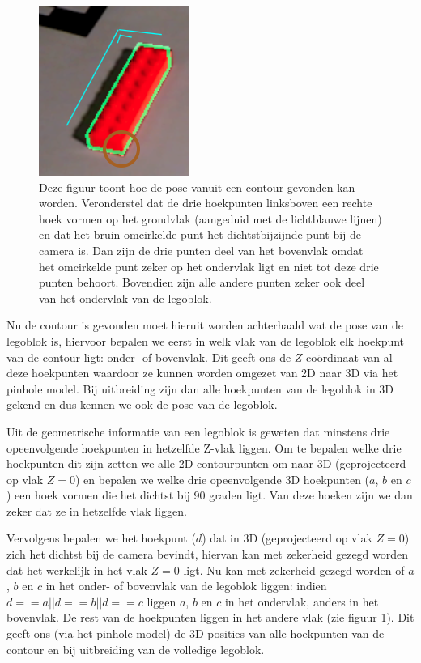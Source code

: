 \begin{figure}
  \centering
  \includegraphics[width=0.5\linewidth]{img/brickPoseDetect}
  \caption{Deze figuur toont hoe de pose vanuit een contour gevonden kan worden. Veronderstel dat de drie hoekpunten linksboven een rechte hoek vormen op het grondvlak (aangeduid met de lichtblauwe lijnen) en dat het bruin omcirkelde punt het dichtstbijzijnde punt bij de camera is. Dan zijn de drie punten deel van het bovenvlak omdat het omcirkelde punt zeker op het ondervlak ligt en niet tot deze drie punten behoort. Bovendien zijn alle andere punten zeker ook deel van het ondervlak van de legoblok.}
  \label{fig:brickPoseDetect}
\end{figure}

Nu de contour is gevonden moet hieruit worden achterhaald wat de pose van de legoblok is, hiervoor bepalen we eerst in welk vlak van de legoblok elk hoekpunt van de contour ligt: onder- of bovenvlak. Dit geeft ons de $Z$ co\"ordinaat van al deze hoekpunten waardoor ze kunnen worden omgezet van 2D naar 3D via het pinhole model. Bij uitbreiding zijn dan alle hoekpunten van de legoblok in 3D gekend en dus kennen we ook de pose van de legoblok.

Uit de geometrische informatie van een legoblok is geweten dat minstens drie opeenvolgende hoekpunten in hetzelfde Z-vlak liggen. Om te bepalen welke drie hoekpunten dit zijn zetten we alle 2D contourpunten om naar 3D (geprojecteerd op vlak $Z = 0$) en bepalen we welke drie opeenvolgende 3D hoekpunten ($a$, $b$ en $c$) een hoek vormen die het dichtst bij 90 graden ligt. Van deze hoeken zijn we dan zeker dat ze in hetzelfde vlak liggen.

Vervolgens bepalen we het hoekpunt ($d$) dat in 3D (geprojecteerd op vlak $Z = 0$) zich het dichtst bij de camera bevindt, hiervan kan met zekerheid gezegd worden dat het werkelijk in het vlak $Z = 0$ ligt. Nu kan met zekerheid gezegd worden of $a$, $b$ en $c$ in het onder- of bovenvlak van de legoblok liggen: indien $d == a || d == b || d == c$ liggen $a$, $b$ en $c$ in het ondervlak, anders in het bovenvlak. De rest van de hoekpunten liggen in het andere vlak (zie figuur \ref{fig:brickPoseDetect}). Dit geeft ons (via het pinhole model) de 3D posities van alle hoekpunten van de contour en bij uitbreiding van de volledige legoblok.

